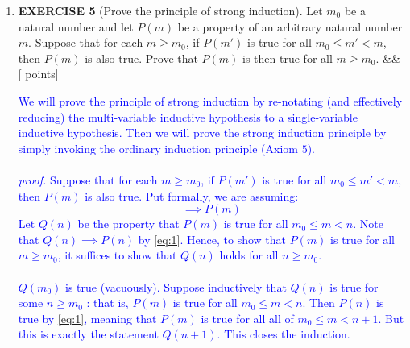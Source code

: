 \documentclass[12pt]{article}
\newcommand{\points}[1]{\hfill {[#1 points]}}
\newcommand{\problem}[2][]{%
  \item {#2}%
  \ifx&#1&%
  \else%
    \points{#1}%
  \fi
  \par\vspace{0.5em}
}
\begin{document}
\begin{enumerate}[leftmargin=*, label=\textbf{\arabic*.}]
\begin{enumerate}
	\problem{If $a > b$, then $a\text{++} > b$}	
	\textcolor{blue}{
	\begin{align*}
	a > b \implies& a\text{++} > a > b \;\; \text{(definition of successor)}\\
	\implies& a\text{++} > b \;\; \text{(transitivity)}\\
	\end{align*}}
	
	\problem{If $a = b$, then $a\text{++} > b$}	
	\textcolor{blue}{
	\begin{align*}
	a = b \implies& a\text{++} > a = b \;\; \text{(definition of successor)}\\
	\implies& a\text{++} > b\\
	\end{align*}}
	\end{enumerate}
	
	\problem{\textbf{EXERCISE 5} (Prove the principle of strong induction). Let $m_0$ be a natural number and let $P(m)$ be a property of an arbitrary natural number $m$. Suppose that for each $m \geq m_0$, if $P(m')$ is true for all $m_0 \leq m' < m$, then $P(m)$ is also true. Prove that $P(m)$ is then true for all $m \geq m_0$.}
	\textcolor{blue}{
	We will prove the principle of strong induction by re-notating (and effectively reducing) the multi-variable inductive hypothesis to a single-variable inductive hypothesis. Then we will prove the strong induction principle by simply invoking the ordinary induction principle (Axiom $5$). \\ \\
	\textit{proof.} Suppose that for each $m \geq m_0$, if $P(m')$ is true for all $m_0 \leq m' < m$, then $P(m)$ is also true. Put formally, we are assuming: 
	\begin{equation}
	[\forall m \geq m_0(\forall m' (m_0 \leq m' < m) \implies P(m'))] \implies P(m)
	\label{eq:1}
	\end{equation}
	Let $Q(n)$ be the property that $P(m)$ is true for all $m_0 \leq m < n$. Note that $Q(n) \implies P(n)$ by \eqref{eq:1}. Hence, to show that $P(m)$ is true for all $m \geq m_0$, it suffices to show that $Q(n)$ holds for all $n \geq m_0$. \\ \\$Q(m_0)$ is true (vacuously). Suppose inductively that $Q(n)$ is true for some $n \geq m_0$ : that is, $P(m)$ is true for all $m_0 \leq m < n$. Then $P(n)$ is true by \eqref{eq:1}, meaning that $P(m)$ is true for all all of $m_0 \leq m < n+1$. But this is exactly the statement $Q(n+1)$. This closes the induction.}
	

\end{enumerate}
\end{document}
